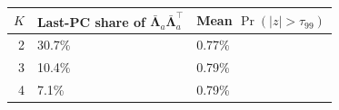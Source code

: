 
\begin{tabular}{rll}
\toprule
$K$ & Last-PC share of $\bar{\boldsymbol\Lambda}_a\bar{\boldsymbol\Lambda}_a^\top$ & Mean $\Pr(|z|>\tau_{99})$\\
\midrule
2 & 30.7\% & 0.77\%\\
3 & 10.4\% & 0.79\%\\
4 & 7.1\% & 0.79\%\\
\bottomrule
\end{tabular}
